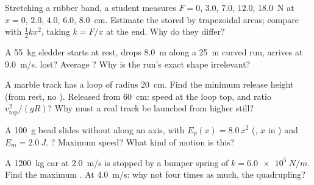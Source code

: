 \begin{exercise}[$\star\star$]\label{exo:g12:work-and-energy:7}
Stretching a rubber band, a student measures $F = 0$, $3.0$, $7.0$,
$12.0$, \qty{18.0}{N} at $x = 0$, $2.0$, $4.0$, $6.0$, \qty{8.0}{cm}.
Estimate the stored  by trapezoidal areas; compare with
$\tfrac12 kx^2$, taking $k = F/x$ at the end. Why do they differ?
\end{exercise}

\begin{exercise}[$\star\star$]\label{exo:g12:work-and-energy:8}
A \qty{55}{kg} sledder starts at rest, drops \qty{8.0}{m} along a
\qty{25}{m} curved run, arrives at \qty{9.0}{m/s}. 
lost? Average  ? Why is the run's exact shape irrelevant?
\end{exercise}

\begin{exercise}[$\star\star$]\label{exo:g12:work-and-energy:9}
A marble track has a loop of radius \qty{20}{cm}. Find the minimum
release height (from rest, no ). Released from \qty{60}{cm}:
speed at the loop top, and ratio $v_{\text{top}}^2/(gR)$? Why must a
real track be launched from higher still?
\end{exercise}

\begin{exercise}[$\star\star$]\label{exo:g12:work-and-energy:10}
A \qty{100}{g} bead slides without  along an axis, with
$E_p(x) = 8.0\,x^2$ (, $x$ in ) and $E_m = \qty{2.0}{J}$.
? Maximum speed? What kind of motion is this?
\end{exercise}

\begin{exercise}[$\star\star$]\label{exo:g12:work-and-energy:11}
A \qty{1200}{kg} car at \qty{2.0}{m/s} is stopped by a bumper spring
of  $k = \qty{6.0e5}{N/m}$. Find the maximum .
At \qty{4.0}{m/s}: why not four times as much, the  quadrupling?
\end{exercise}

